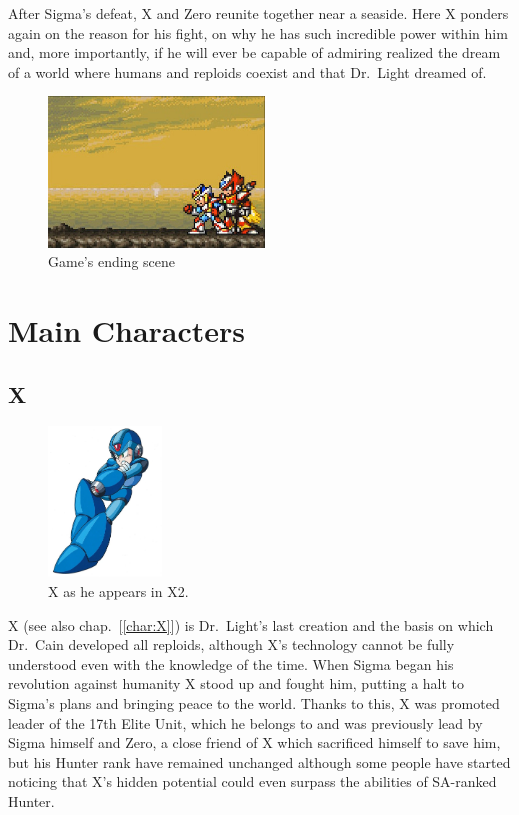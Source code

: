 After Sigma's defeat, X and Zero reunite together near a seaside. Here X ponders again on the reason for his fight, on why he has such incredible power within him and, more importantly, if he will ever be capable of admiring realized the dream of a world where humans and reploids coexist and that Dr.~Light dreamed of.

\begin{figure}[htp]
	\centering
	\includegraphics[height=4cm]{figures/X2/Ending.jpg}
	\caption{Game's ending scene}
\end{figure}
\section{Main Characters}

\subsection{X}

\begin{figure}[htp]
	\centering
	\includegraphics[height=4cm]{figures/X2/X.png}
	\caption{X as he appears in X2.}
\end{figure}

X (see also chap.~[\ref{char:X}])  is Dr.~Light's last creation and the basis on which Dr.~Cain developed all reploids, although X's technology cannot be fully understood even with the knowledge of the time. When Sigma began his revolution against humanity X stood up and fought him, putting a halt to Sigma's plans and bringing peace to the world. Thanks to this, X was promoted leader of the 17th Elite Unit, which he belongs to and was previously lead by Sigma himself and Zero, a close friend of X which sacrificed himself to save him, but his Hunter rank have remained unchanged although some people have started noticing that X's hidden potential could even surpass the abilities of SA-ranked Hunter.

